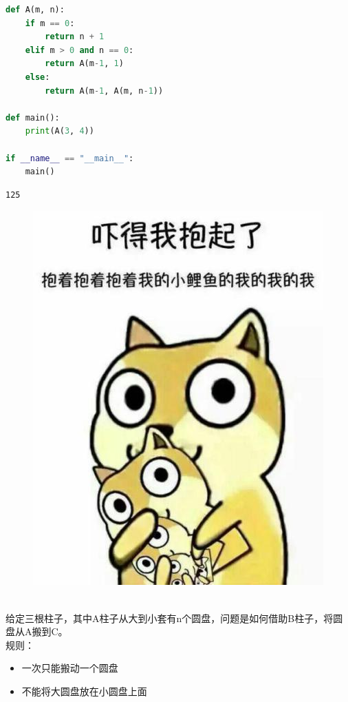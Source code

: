 \begin{lstlisting}[language=Python]
def A(m, n):
	if m == 0:
		return n + 1
	elif m > 0 and n == 0:
		return A(m-1, 1)
	else:
		return A(m-1, A(m, n-1))

def main():
	print(A(3, 4))

if __name__ == "__main__":
	main()
\end{lstlisting}

\begin{tcolorbox}
	\begin{verbatim}
125
\end{verbatim}
\end{tcolorbox}

\begin{figure}[H]
	\centering
	\includegraphics[]{img/Chapter5/5-5/2.png}
\end{figure}

\\

给定三根柱子，其中A柱子从大到小套有n个圆盘，问题是如何借助B柱子，将圆盘从A搬到C。\\

规则：

\begin{itemize}
	\item 一次只能搬动一个圆盘
	\item 不能将大圆盘放在小圆盘上面
\end{itemize}

